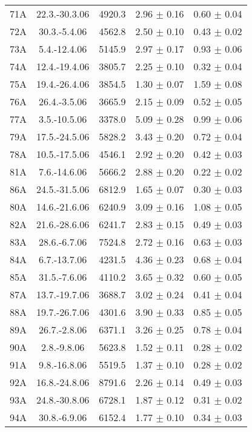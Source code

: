 \documentclass[a4paper,12pt]{article}
\begin{document}
\begin{center}
\begin{longtable}{|c|c|c|c|c|}
    71A	&	22.3.-30.3.06	&	4920.3	&	2.96 $\pm$ 0.16	&	0.60 $\pm$ 0.04	\\
    72A	&	30.3.-5.4.06	&	4562.8	&	2.50 $\pm$ 0.10	&	0.43 $\pm$ 0.02	\\
    73A	&	5.4.-12.4.06	&	5145.9	&	2.97 $\pm$ 0.17	&	0.93 $\pm$ 0.06	\\
    74A	&	12.4.-19.4.06	&	3805.7	&	2.25 $\pm$ 0.10	&	0.32 $\pm$ 0.04	\\
    75A	&	19.4.-26.4.06	&	3854.5	&	1.30 $\pm$ 0.07	&	1.59 $\pm$ 0.08	\\
    76A	&	26.4.-3.5.06	&	3665.9	&	2.15 $\pm$ 0.09	&	0.52 $\pm$ 0.05	\\
    77A	&	3.5.-10.5.06	&	3378.0	&	5.09 $\pm$ 0.28	&	0.99 $\pm$ 0.06	\\
    79A	&	17.5.-24.5.06	&	5828.2	&	3.43 $\pm$ 0.20	&	0.72 $\pm$ 0.04	\\
    78A	&	10.5.-17.5.06	&	4546.1	&	2.92 $\pm$ 0.20	&	0.42 $\pm$ 0.03	\\
    81A	&	7.6.-14.6.06	&	5666.2	&	2.88 $\pm$ 0.20	&	0.22 $\pm$ 0.02	\\
    86A	&	24.5.-31.5.06	&	6812.9	&	1.65 $\pm$ 0.07	&	0.30 $\pm$ 0.03	\\
    80A	&	14.6.-21.6.06	&	6240.9	&	3.09 $\pm$ 0.16	&	1.08 $\pm$ 0.05	\\
    82A	&	21.6.-28.6.06	&	6241.7	&	2.83 $\pm$ 0.15	&	0.49 $\pm$ 0.03	\\
    83A	&	28.6.-6.7.06	&	7524.8	&	2.72 $\pm$ 0.16	&	0.63 $\pm$ 0.03	\\
    84A	&	6.7.-13.7.06	&	4231.5	&	4.36 $\pm$ 0.23	&	0.68 $\pm$ 0.04	\\
    85A	&	31.5.-7.6.06	&	4110.2	&	3.65 $\pm$ 0.32	&	0.60 $\pm$ 0.05	\\
    87A	&	13.7.-19.7.06	&	3688.7	&	3.02 $\pm$ 0.24	&	0.41 $\pm$ 0.04	\\
    88A	&	19.7.-26.7.06	&	4301.6	&	3.90 $\pm$ 0.33	&	0.85 $\pm$ 0.05	\\
    89A	&	26.7.-2.8.06	&	6371.1	&	3.26 $\pm$ 0.25	&	0.78 $\pm$ 0.04	\\
    90A	&	2.8.-9.8.06	&	5623.8	&	1.52 $\pm$ 0.11	&	0.28 $\pm$ 0.02	\\
    91A	&	9.8.-16.8.06	&	5519.5	&	1.37 $\pm$ 0.10	&	0.28 $\pm$ 0.02	\\
    92A	&	16.8.-24.8.06	&	8791.6	&	2.26 $\pm$ 0.14	&	0.49 $\pm$ 0.03	\\
    93A	&	24.8.-30.8.06	&	6728.1	&	1.87 $\pm$ 0.12	&	0.31 $\pm$ 0.02	\\
    94A	&	30.8.-6.9.06	&	6152.4	&	1.77 $\pm$ 0.10	&	0.34 $\pm$ 0.03	\\

\end{longtable}
\end{center}
\end{document}

